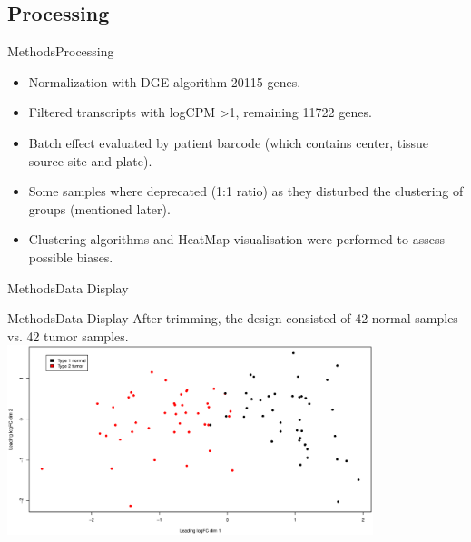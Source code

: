 \documentclass{beamer}
\begin{document}
\subsection{Processing}
\begin{frame}{Methods}{Processing}
	\begin{itemize}
		\item Normalization with DGE algorithm \cite{Robinson01012010} 20115 genes.
		\item Filtered transcripts with logCPM \textgreater 1, remaining 11722 genes.
		\item Batch effect evaluated by patient barcode  (which contains center, tissue source site and plate).
		\item Some samples where deprecated (1:1 ratio) as they disturbed the clustering of groups (mentioned later).
		\item Clustering algorithms and HeatMap visualisation were performed to assess possible biases.
	\end{itemize}

\end{frame}

\begin{frame}{Methods}{Data Display}
	\centering
	
	
  
\end{frame}

\begin{frame}{Methods}{Data Display}
  After trimming, the design consisted of 42 normal samples vs. 42 tumor samples.
  \includegraphics[width=0.8\textwidth,height=0.8\textheight,keepaspectratio]{mds4-1.eps}
\end{frame}
\end{document}
